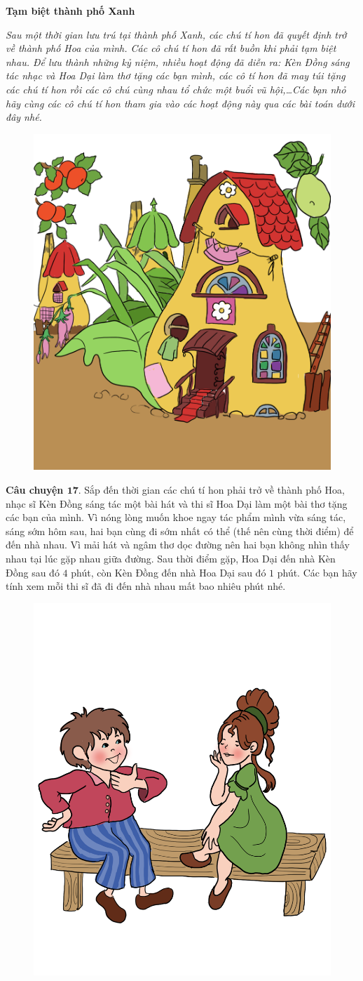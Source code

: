 	\centerline{\textbf{\color{toancuabi}Tạm biệt thành phố Xanh}}
	\vskip 0.1cm
	\textit{Sau một thời gian lưu trú tại thành phố Xanh, các chú tí hon đã quyết định trở về thành phố Hoa của mình. Các cô chú tí hon đã rất buồn khi phải tạm biệt nhau. Để lưu thành những kỷ niệm, nhiều hoạt động đã diễn ra: Kèn Đồng sáng tác nhạc và Hoa Dại làm thơ tặng các bạn mình, các cô tí hon đã may túi tặng các chú tí hon rồi các cô chú cùng nhau tổ chức một buổi vũ hội,\ldots Các bạn nhỏ hãy cùng các cô chú tí hon tham gia vào các hoạt động này qua các bài toán dưới đây nhé.}
	
	\begin{figure}[H]
		\centering
		\vspace*{-5pt}
		\captionsetup{labelformat= empty, justification=centering}
		\includegraphics[width=0.3\linewidth]{Hinh10_ThanhPhoXanh}
		\vspace*{-10pt}
	\end{figure}
	\textbf{\color{toancuabi}Câu chuyện $\pmb{17.}$} Sắp đến thời gian các chú tí hon phải trở về thành phố Hoa, nhạc sĩ Kèn Đồng sáng tác một bài hát và thi sĩ Hoa Dại làm một bài thơ tặng các bạn của mình. Vì nóng lòng muốn khoe ngay tác phẩm mình vừa sáng tác, sáng sớm hôm sau, hai bạn cùng đi sớm nhất có thể (thế nên cùng thời điểm) để đến nhà nhau. Vì mải hát và ngâm thơ dọc đường nên hai bạn không nhìn thấy nhau tại lúc gặp nhau giữa đường. Sau thời điểm gặp, Hoa Dại đến nhà Kèn Đồng sau đó $4$ phút, còn Kèn Đồng đến nhà Hoa Dại sau đó $1$ phút. Các bạn hãy tính xem mỗi thi sĩ đã đi đến nhà nhau mất bao nhiêu phút nhé.
		\begin{figure}[H]
		\centering
		\vspace*{-5pt}
		\captionsetup{labelformat= empty, justification=centering}
		\includegraphics[width=0.45\linewidth]{Hinh19_KenDong_HoaGiay}
		\vspace*{-15pt}
	\end{figure}
